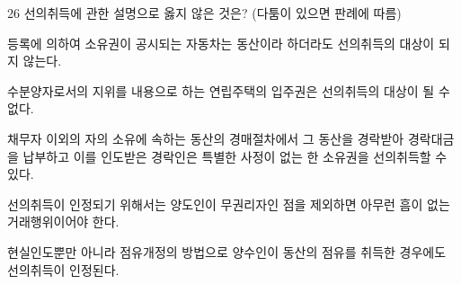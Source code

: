\begin{question}{26}
선의취득에 관한 설명으로 옳지 않은 것은? (다툼이 있으면 판례에 따름)
\begin{choices}
  \item 등록에 의하여 소유권이 공시되는 자동차는 동산이라 하더라도 선의취득의 대상이 되지 않는다.
  \item 수분양자로서의 지위를 내용으로 하는 연립주택의 입주권은 선의취득의 대상이 될 수 없다.
  \item 채무자 이외의 자의 소유에 속하는 동산의 경매절차에서 그 동산을 경락받아 경락대금을 납부하고 이를 인도받은 경락인은 특별한 사정이 없는 한 소유권을 선의취득할 수 있다.
  \item 선의취득이 인정되기 위해서는 양도인이 무권리자인 점을 제외하면 아무런 흠이 없는 거래행위이어야 한다.
  \item 현실인도뿐만 아니라 점유개정의 방법으로 양수인이 동산의 점유를 취득한 경우에도 선의취득이 인정된다.
\end{choices}
\end{question}
